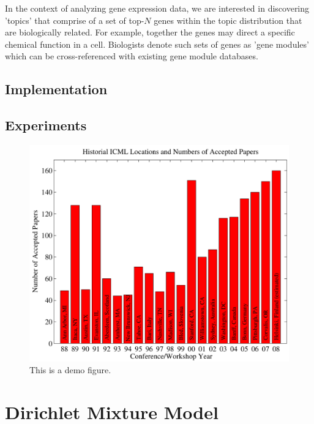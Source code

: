 \documentclass{article}
\begin{document}
In the context of analyzing gene expression data, we are interested in discovering 'topics' that comprise of a set of top-$N$ genes within the topic distribution that are biologically related. For example, together the genes may direct a specific chemical function in a cell. Biologists denote such sets of genes as 'gene modules' which can be cross-referenced with existing gene module databases.

\subsection{Implementation} 

\subsection{Experiments} 


\begin{figure}[h]
\vskip 0.2in
\begin{center}
\centerline{\includegraphics[width=\columnwidth]{figs/examplegraph}}
\caption{This is a demo figure.}
\label{alabel}
\end{center}
\vskip -0.2in
\end{figure} 





\section{Dirichlet Mixture Model} 
\label{mmsec}
\end{document}
